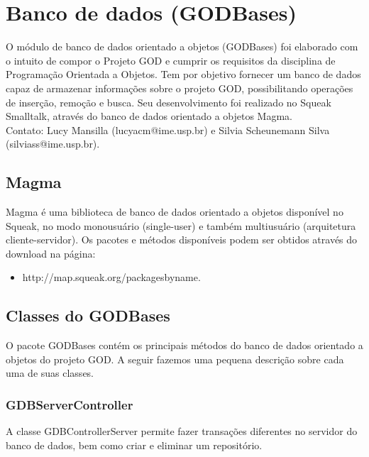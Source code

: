 \section{Banco de dados (GODBases)}

O módulo de banco de dados orientado a objetos (GODBases) foi elaborado com o intuito de compor o Projeto GOD e cumprir os requisitos da disciplina de Programação Orientada a Objetos. Tem por objetivo fornecer um banco de dados capaz de armazenar informações sobre o projeto GOD, possibilitando operações de inserção, remoção e busca. Seu desenvolvimento foi realizado no Squeak Smalltalk, através do banco de dados orientado a objetos Magma.\\
Contato: Lucy Mansilla (lucyacm@ime.usp.br) e Silvia Scheunemann Silva (silviass@ime.usp.br).


\subsection{Magma}
Magma é uma biblioteca de banco de dados orientado a objetos disponível no Squeak, no modo monousuário (single-user) e também multiusuário (arquitetura cliente-servidor). Os pacotes e métodos disponíveis podem ser obtidos através do download na página:
\begin{itemize}
\item{http://map.squeak.org/packagesbyname.}
\end{itemize}

\subsection{ Classes do GODBases}
O pacote GODBases contém os principais métodos do banco de dados orientado a objetos do projeto GOD. A seguir fazemos uma pequena descrição sobre cada uma de suas classes.


\subsubsection{GDBServerController}

A classe GDBControllerServer permite fazer transações diferentes no servidor do banco de dados, bem como criar e eliminar um repositório. 

